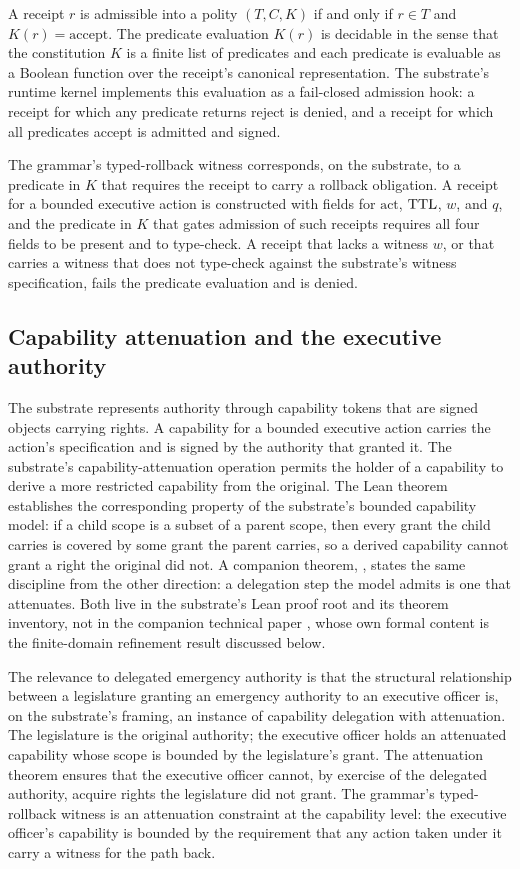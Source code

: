 A receipt $r$ is admissible into a polity $(T, C, K)$ if and only if $r \in T$ and $K(r) = \text{accept}$.
The predicate evaluation $K(r)$ is decidable in the sense that the constitution $K$ is a finite list of
predicates and each predicate is evaluable as a Boolean function over the receipt's canonical representation.
The substrate's runtime kernel implements this evaluation as a fail-closed admission hook:
a receipt for which any predicate returns reject is denied,
and a receipt for which all predicates accept is admitted and signed.

The grammar's typed-rollback witness corresponds, on the substrate, to a predicate in $K$ that requires the receipt
to carry a rollback obligation.
A receipt for a bounded executive action is constructed with fields for $\text{act}$, $\mathrm{TTL}$, $w$, and $q$,
and the predicate in $K$ that gates admission of such receipts requires all four fields to be present and to type-check.
A receipt that lacks a witness $w$, or that carries a witness that does not type-check against the substrate's
witness specification,
fails the predicate evaluation and is denied.

\subsection{Capability attenuation and the executive authority}

The substrate represents authority through capability tokens that are signed objects carrying rights.
A capability for a bounded executive action carries the action's specification and is signed by the authority
that granted it.
The substrate's capability-attenuation operation permits the holder of a capability to derive a more restricted
capability from the original.
The Lean theorem  establishes the corresponding property of the substrate's bounded
capability model: if a child scope is a subset of a parent scope, then every grant the child carries is covered by
some grant the parent carries, so a derived capability cannot grant a right the original did not.
A companion theorem, , states the same discipline from the other
direction: a delegation step the model admits is one that attenuates.
Both live in the substrate's Lean proof root and its theorem inventory, not in the companion technical paper
\cite{ref_chio_parent_paper}, whose own formal content is the finite-domain refinement result discussed below.

The relevance to delegated emergency authority is that the structural relationship between a legislature granting
an emergency authority to an executive officer is, on the substrate's framing, an instance of capability delegation
with attenuation.
The legislature is the original authority;
the executive officer holds an attenuated capability whose scope is bounded by the legislature's grant.
The attenuation theorem ensures that the executive officer cannot, by exercise of the delegated authority,
acquire rights the legislature did not grant.
The grammar's typed-rollback witness is an attenuation constraint at the capability level:
the executive officer's capability is bounded by the requirement that any action taken under it
carry a witness for the path back.

